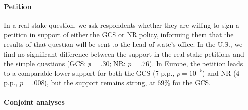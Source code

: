 \paragraph{Petition}\label{subsubsec:petition}%

In a real-stake question, we ask respondents whether they are willing to sign a petition in support of either the GCS or NR policy, informing them that the results of that question will be sent to the head of state's office.
In the U.S., we find no significant difference between the support in the real-stake petitions and the simple questions (GCS: $p=.30$; NR: $p=.76$). %
In Europe, the petition leads to a comparable lower support for both the GCS (7 p.p., $p=10^{-5}$) and NR (4 p.p., $p = .008$), but the support remains strong, at 69\% for the GCS. 

\paragraph{Conjoint analyses}\label{subsubsec:conjoint}%

